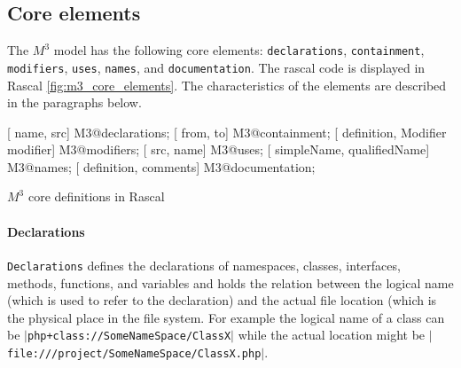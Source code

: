 \documentclass[../main.tex]{subfiles}
\begin{document}
    \subsection{Core elements}
    The $M^3$ model has the following core elements: \texttt{declarations}, \texttt{containment}, \texttt{modifiers}, \texttt{uses}, \texttt{names}, and \texttt{documentation}.
    The rascal code is displayed in Rascal \ref{fig:m3_core_elements}. The characteristics of the elements are described in the paragraphs below.

    \begin{program}    
    \begin{rascal}%
 [ name,  src] M3@declarations; 
 [ from,  to] M3@containment; 
 [ definition, Modifier modifier] M3@modifiers; 
 [ src,  name] M3@uses; 
 [ simpleName,  qualifiedName] M3@names; 
 [ definition,  comments] M3@documentation; \end{rascal}%
	
	\caption{$M^3$ core definitions in Rascal}
	\label{fig:m3_core_elements}
	\end{program}
	    
    \paragraph{Declarations} \texttt{Declarations} defines the declarations of namespaces, classes, interfaces, methods, functions, and variables and holds the relation between the logical name (which is used to refer to the declaration) and the actual file location (which is the physical place in the file system.
    For example the logical name of a class can be \texttt{$\vert$php+class://SomeNameSpace/ClassX$\vert$} while the actual location might be \texttt{$\vert$file:///project/SomeNameSpace/ClassX.php$\vert$}.
    
\end{document}
